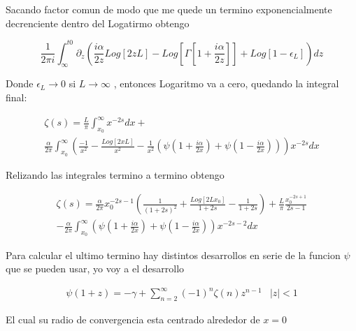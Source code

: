 Sacando factor comun de modo que me quede un termino exponencialmente decrenciente dentro del Logatirmo obtengo

\begin{equation}
\frac{1}{2 \pi i}  \int _{\infty} ^{t0} 
\partial _{z}
\left(
\frac{i\alpha}{2 z} Log[2 z L] - Log[\Gamma[1 + \frac{i \alpha}{2 z}]] +
Log[1- \epsilon _L ]
\right)
d z
\end{equation}

Donde $ \epsilon _L \rightarrow 0$ si $L \rightarrow \infty $ , entonces Logaritmo va a cero, quedando la integral final:

\begin{equation}
\begin{array}{c}
\zeta (s) = 
\frac{L}{\pi}
\int _ {x_0} ^{\infty} x ^{-2s} dx + \\
\frac{\alpha}{2 \pi } \int _{x_0} ^{\infty} 
\left(
\frac{-1}{ x ^2} -
\frac{Log[2 x L]}{x ^2}  -
\frac{1}{ x ^2 } 
\left(
\psi (1 + \frac{i \alpha}{2 x}) + \psi (1 - \frac{i \alpha}{2 x}) 
\right)
\right)
x ^{-2s} d x
\end{array}
\end{equation}



Relizando las integrales termino a termino obtengo

\begin{equation}
\begin{array}{c}
\zeta (s) = 
\frac{\alpha}{2 \pi} x _{0} ^{-2s-1}
\left( 
\frac{1}{(1+2s) ^2} +
\frac{Log[2 L x _0]}{1+2s} -
\frac{1}{1+2s}
\right) + 
\frac{L}{\pi} \frac{x _0 ^{-2s+1}}{2s-1}  \\
- \frac{\alpha}{2 \pi}
\int _{x_0} ^{\infty} 
\left(
\psi(1 + \frac{i \alpha}{2 x}) +
\psi(1 - \frac{i \alpha}{2 x} )
\right)
x ^{-2s-2}
dx
\end{array}
\end{equation}


Para calcular el ultimo termino hay distintos desarrollos en serie de la funcion $\psi $ que se pueden usar, yo voy a el desarrollo 

\begin{equation}
\begin{array}{cc}
\psi (1+ z ) = - \gamma + \sum _{n=2} ^{\infty} (-1) ^n \zeta (n) z ^{n-1} & |z| < 1
\end{array}
\end{equation}

El cual su radio de convergencia esta centrado alrededor de $x = 0$

